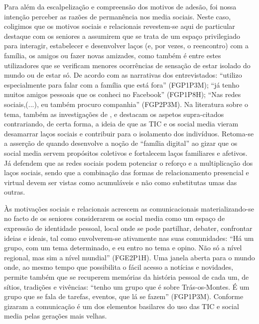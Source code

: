 \documentclass[portuguese]{textolivre}
\begin{document}
Para além da escalpelização e compreensão dos motivos de adesão, foi nossa intenção perceber as razões de permanência nos media sociais. Neste caso, coligimos que os motivos sociais e relacionais revestem-se aqui de particular destaque com os seniores a assumirem que se trata de um espaço privilegiado para interagir, estabelecer e desenvolver laços (e, por vezes, o reencontro) com a família, os amigos ou fazer novas amizades, como também é entre estes utilizadores que se verificam menores ocorrências de sensação de estar isolado do mundo ou de estar só. De acordo com as narrativas dos entrevistados: “utilizo especialmente para falar com a família que está fora” (FGP1P3M); “já tenho muitos amigos pessoais que os conheci no Facebook” (FGP1P8H); “Nas redes sociais,(...), eu também procuro companhia” (FGP2P3M). Na literatura sobre o tema, também as investigações de \textcite{nimrod2012}, \textcite{nguyen2013} e \textcite{balcerzak2017} destacam os aspetos supra-citados contrariando, de certa forma, a ideia de que as TIC e os social media vieram desamarrar laços sociais e contribuir para o isolamento dos indivíduos. Retoma-se a asserção de \textcite{taipale2019} quando desenvolve a noção de “família digital” ao gizar que os social media servem propósitos coletivos e fortalecem laços familiares e afetivos. Já \textcite{cardoso2005, cardoso2015} defendem que as redes sociais podem potenciar o reforço e a multiplicação dos laços sociais, sendo que a combinação das formas de relacionamento presencial e virtual devem ser vistas como acumuláveis e não como substitutas umas das outras.

Às motivações sociais e relacionais acrescem as comunicacionais materializando-se no facto de os seniores considerarem os social media como um espaço de expressão de identidade pessoal, local onde se pode partilhar, debater, confrontar ideias e ideais, tal como envolverem-se ativamente nas suas comunidades: “Há um grupo, com um tema determinado, e eu entro no tema e opino. Não só a nível regional, mas sim a nível mundial” (FGE2P1H). Uma janela aberta para o mundo onde, ao mesmo tempo que possibilita o fácil acesso a notícias e novidades, permite também que se recuperem memórias da história pessoal de cada um, de sítios, tradições e vivências: “tenho um grupo que é sobre Trás-os-Montes. É um grupo que se fala de tarefas, eventos, que lá se fazem” (FGP1P3M). Conforme \textcite{ferreira2019, ferreira2016} gizaram a comunicação é um dos elementos basilares do uso das TIC e social media pelas gerações mais velhas.
\end{document}
